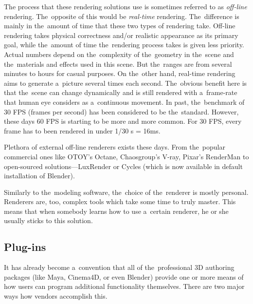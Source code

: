 \documentclass[
  digital, %
  table,   %
  nolof,     %
  nolot,     %
  oneside,
]{fithesis3}
\begin{document}
The process that these rendering solutions use is sometimes referred to as \textit{off-line} rendering. The opposite of this would be \textit{real-time} rendering. The difference is mainly in the amount of time that these two types of rendering take. Off-line rendering takes physical correctness and/or realistic appearance as its primary goal, while the amount of  time the rendering process takes is given less priority. Actual numbers depend on the complexity of the geometry in the scene and the materials and effects used in this scene. But the ranges are from several minutes to hours for casual purposes. On the other hand, real-time rendering aims to generate a picture several times each second. The obvious benefit here is that the scene can change dynamically and is still rendered with a frame-rate that human eye considers as a continuous movement. In past, the benchmark of 30 FPS (frames per second) has been considered to be the standard. However, these days 60 FPS is starting to be more and more common. For 30 FPS, every frame has to been rendered in under 1/30 s = 16ms.

Plethora of external off-line renderers exists these days. From the popular commercial ones like OTOY's Octane, Chaosgroup's V-ray, Pixar's RenderMan to open-sourced solutions—LuxRender or Cycles (which is now available in default installation of Blender).

Similarly to the modeling software, the choice of the renderer is mostly personal. Renderers are, too, complex tools  which take some time to truly master. This means that when somebody learns how to use a certain renderer, he or she usually sticks to this solution.

\subsection{Plug-ins}
It has already become a convention that all of the professional 3D authoring packages (like Maya, Cinema4D, or even Blender) provide one or more means of how users can program additional functionality themselves. There are two major ways how vendors accomplish this.
\end{document}

